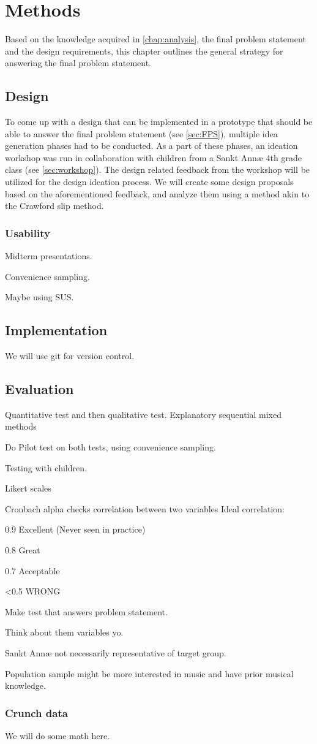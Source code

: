 \chapter{Methods}
Based on the knowledge acquired in \autoref{chap:analysis}, the final problem statement and the design requirements, this chapter outlines the general strategy for answering the final problem statement.
\section{Design}
To come up with a design that can be implemented in a prototype that should be able to answer the final problem statement (see \autoref{sec:FPS}), multiple idea generation phases had to be conducted. As a part of these phases, an ideation workshop was run in collaboration with children from a Sankt Annæ 4th grade class (see \autoref{sec:workshop}). The design related feedback from the workshop will be utilized for the design ideation process. 
We will create some design proposals based on the aforementioned feedback, and analyze them using a method akin to the Crawford slip method\cite{crawfordSlip}.
\subsection{Usability}
Midterm presentations.

Convenience sampling.

Maybe using SUS.
\section{Implementation}
We will use git for version control.
\section{Evaluation}
Quantitative test and then qualitative test.
Explanatory sequential mixed methods\cite[p.~21]{bjoernerBog}

Do Pilot test on both tests, using convenience sampling.

Testing with children\cite[p.~207]{bjoernerBog}.

Likert scales

Cronbach alpha checks correlation between two variables
Ideal correlation:

0.9 Excellent (Never seen in practice)

0.8 Great

0.7 Acceptable

<0.5 WRONG

Make test that answers problem statement.

Think about them variables yo.

Sankt Annæ not necessarily representative of target group.

Population sample might be more interested in music and have prior musical knowledge.

\subsection{Crunch data}
	We will do some math here.\cite{nyBog}